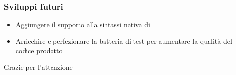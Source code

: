 \documentclass{beamer}
\begin{document}
\begin{frame}
  \frametitle{Sviluppi futuri}
  \begin{itemize}
  	\item Aggiungere il supporto alla sintassi nativa di \lset{}
  	\item Arricchire e perfezionare la batteria di test per aumentare la qualità del codice prodotto
  \end{itemize}
\end{frame}


\begin{frame}
  \Huge{\centerline{Grazie per l'attenzione}}
\end{frame}

\end{document}
